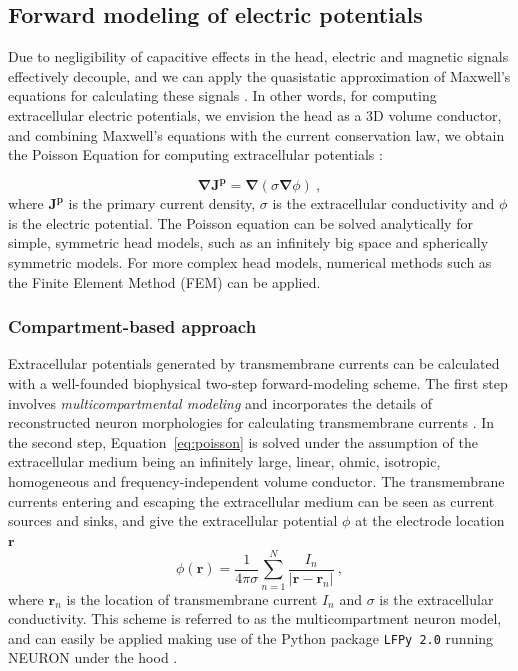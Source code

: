 \documentclass[preprint,10pt,authoryear]{elsarticle}
\begin{document}
\subsection{Forward modeling of electric potentials}
Due to negligibility of capacitive effects in the head, electric and magnetic signals effectively decouple, and we can apply the quasistatic approximation of Maxwell's equations for calculating these signals \citep{HAMALAINEN1993,NUNEZ2006}. In other words, for computing extracellular electric potentials, we envision the head as a 3D volume conductor, and combining Maxwell's equations with the current conservation law, we obtain the Poisson Equation for computing extracellular potentials \cite{GRIFFITHS1999}:


\begin{equation} \label{eq:poisson}
\mathbf{\nabla} \mathbf{J^p} = \mathbf{\nabla} (\sigma \mathbf{\nabla} \phi)~,
\end{equation}
where $\mathbf{J^p}$ is the primary current density, $\sigma$ is the extracellular conductivity and $\phi$ is the electric potential. The Poisson equation can be solved analytically for simple, symmetric head models, such as an infinitely big space and spherically symmetric models. For more complex head models, numerical methods such as the Finite Element Method (FEM) can be applied.

\subsubsection{Compartment-based approach}\label{subsubsec:multicomp}
Extracellular potentials generated by transmembrane currents can be calculated with a well-founded biophysical two-step forward-modeling scheme. The first step involves \textit{multicompartmental modeling} and incorporates the details of reconstructed neuron morphologies for calculating transmembrane currents \citep{STERRATT2011}. In the second step, Equation~\eqref{eq:poisson} is solved under the assumption of the extracellular medium being an infinitely large, linear, ohmic, isotropic, homogeneous and frequency-independent volume conductor. The transmembrane currents entering and escaping the extracellular medium can be seen as current sources and sinks, and give the extracellular potential $\phi$ at the electrode location $\mathbf{r}$
\begin{equation}
\phi(\mathbf{r}) = \frac{1}{4 \pi \sigma}\sum_{n=1}^N \frac{I_n}{|\mathbf{r} - \mathbf{r}_n|}~,
\label{eq:point_source}
\end{equation}
where $\mathbf{r}_n$ is the location of transmembrane current $I_n$ and $\sigma$ is the extracellular conductivity.
This scheme is referred to as the multicompartment neuron model, and can easily be applied making use of the Python package \texttt{LFPy 2.0} running NEURON under the hood \citep{HAGEN2018,CARNEVALE2006}.
\end{document}
